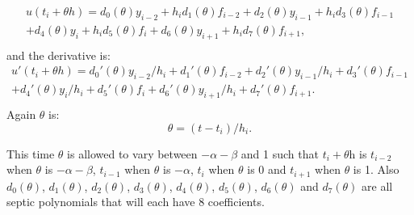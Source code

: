 \documentclass{article}
\begin{document}
\begin{equation}
\begin{split}
u(t_i + \theta h) = d_{0}(\theta)y_{i-2} +  h_id_{1}(\theta)f_{i-2} 
+ d_{2}(\theta)y_{i-1}     +  h_id_{3}(\theta)f_{i-1} \\
+ d_{4}(\theta)y_i     +  h_id_{5}(\theta)f_i 
+ d_{6}(\theta)y_{i + 1} + h_id_{7}(\theta)f_{i + 1}, \\
\end{split}
\end{equation}
and the derivative is:
\begin{equation}
\begin{split}
u'(t_i + \theta h) = d_{0}'(\theta)y_{i-2}/h_i +  d_{1}'(\theta)f_{i-2} 
+ d_{2}'(\theta)y_{i-1}/h_i   +  d_{3}'(\theta)f_{i-1} \\
+ d_{4}'(\theta)y_i/h_i       +  d_{5}'(\theta)f_i 
+ d_{6}'(\theta)y_{i + 1}/h_i +  d_{7}'(\theta)f_{i + 1}. \\
\end{split}
\end{equation}
Again $\theta$ is:
\begin{equation}
\theta = (t - t_i) / h_i.
\end{equation}

This time $\theta$ is allowed to vary between $-\alpha-\beta$ and 1 such that $t_i + \theta$h is $t_{i-2}$ when $\theta$ is $-\alpha-\beta$, $t_{i-1}$ when $\theta$ is $-\alpha$, $t_i$ when $\theta$ is 0 and $t_{i + 1}$ when $\theta$ is 1. Also $d_0(\theta)$, $d_1(\theta)$, $d_2(\theta)$, $d_3(\theta)$, $d_4(\theta)$, $d_5(\theta)$, $d_6(\theta)$ and $d_7(\theta)$ are all septic polynomials that will each have 8 coefficients.
\end{document}
